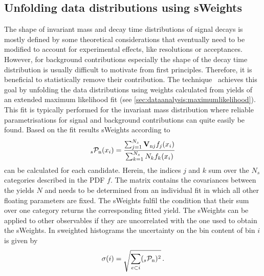 
\subsection{Unfolding data distributions using sWeights}
\label{sec:dataanalysis:selection:splot}

The shape of invariant mass and decay time distributions of signal decays is
mostly defined by some theoretical considerations that eventually need to be
modified to account for experimental effects, like resolutions or acceptances.
However, for background contributions especially the shape of the decay time
distribution is usually difficult to motivate from first principles.
Therefore, it is beneficial to statistically remove their contribution. The
\sPlot technique~\cite{Pivk:2004ty} achieves this goal by unfolding the data
distributions using weights calculated from yields of an extended maximum
likelihood fit (see \cref{sec:dataanalysis:maximumlikelihood}). This fit is
typically performed for the invariant mass distribution where reliable
parametrisations for signal and background contributions can quite easily be
found. Based on the fit results sWeights according to
\begin{align}
	_{s}\mathcal{P}_\text{n}(x_i) = \frac{\sum_{j = 1}^{N_s}\mathbf{V}_{\text{n}j}f_j(x_i)}{\sum_{k = 1}^{N_s} N_k f_k(x_i)}
\label{eq:dataanalysis:selection:splot:weightdefinition}
\end{align}
can be calculated for each candidate. Herein, the indices $j$ and $k$ sum over
the $N_s$ categories described in the PDF $f$. The matrix  contains
the covariances between the yields $N$ and needs to be determined from an
individual fit in which all other floating parameters are fixed. The sWeights
fulfil the condition that their sum over one category returns the
corresponding fitted yield. The sWeights can be applied to other observables
if they are uncorrelated with the one used to obtain the sWeights. In
sweighted histograms the uncertainty on the bin content of bin $i$ is given by
\begin{align}
	\sigma(i) = \sqrt{\sum_{e \subset i} (_{s}\mathcal{P}_\text{n})^2}\,.
\label{eq:dataanalysis:selection:splot:weighterror}
\end{align}